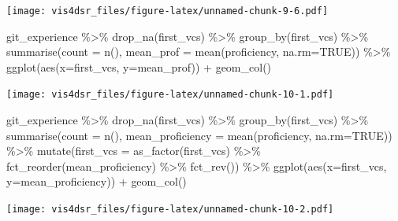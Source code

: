 \documentclass[
]{krantz}
\makeatletter
\newenvironment{Shaded}{\begin{snugshade}}{\end{snugshade}}
\newcommand{\AttributeTok}[1]{\textcolor[rgb]{0.61,0.61,0.61}{#1}}
\newcommand{\ConstantTok}[1]{\textcolor[rgb]{0,0,0}{#1}}
\newcommand{\FunctionTok}[1]{\textcolor[rgb]{0,0,0}{#1}}
\newcommand{\NormalTok}[1]{#1}
\newcommand{\SpecialCharTok}[1]{\textcolor[rgb]{0,0,0}{#1}}
\newenvironment{kframe}{%
\medskip{}
\setlength{\fboxsep}{.8em}
 \def\at@end@of@kframe{}%
 \ifinner\ifhmode%
  \def\at@end@of@kframe{\end{minipage}}%
  \begin{minipage}{\columnwidth}%
 \fi\fi%
 \def\FrameCommand##1{\hskip\@totalleftmargin \hskip-\fboxsep
 \colorbox{shadecolor}{##1}\hskip-\fboxsep
     \hskip-\linewidth \hskip-\@totalleftmargin \hskip\columnwidth}%
 \MakeFramed {\advance\hsize-\width
   \@totalleftmargin\z@ \linewidth\hsize
   \@setminipage}}%
 {\par\unskip\endMakeFramed%
 \at@end@of@kframe}
\renewenvironment{Shaded}{\begin{kframe}}{\end{kframe}}
\makeatother
\begin{document}
\texttt{[image: vis4dsr\_files/figure-latex/unnamed-chunk-9-6.pdf]}

\begin{Shaded}
\begin{Highlighting}[]
\NormalTok{git\_experience }\SpecialCharTok{\%\textgreater{}\%} \FunctionTok{drop\_na}\NormalTok{(first\_vcs) }\SpecialCharTok{\%\textgreater{}\%}
  \FunctionTok{group\_by}\NormalTok{(first\_vcs) }\SpecialCharTok{\%\textgreater{}\%} 
  \FunctionTok{summarise}\NormalTok{(}\AttributeTok{count =} \FunctionTok{n}\NormalTok{(), }\AttributeTok{mean\_prof =} \FunctionTok{mean}\NormalTok{(proficiency, }\AttributeTok{na.rm=}\ConstantTok{TRUE}\NormalTok{)) }\SpecialCharTok{\%\textgreater{}\%}
  \FunctionTok{ggplot}\NormalTok{(}\FunctionTok{aes}\NormalTok{(}\AttributeTok{x=}\NormalTok{first\_vcs, }\AttributeTok{y=}\NormalTok{mean\_prof)) }\SpecialCharTok{+}
    \FunctionTok{geom\_col}\NormalTok{()}
\end{Highlighting}
\end{Shaded}

\texttt{[image: vis4dsr\_files/figure-latex/unnamed-chunk-10-1.pdf]}

\begin{Shaded}
\begin{Highlighting}[]
\NormalTok{git\_experience }\SpecialCharTok{\%\textgreater{}\%} 
  \FunctionTok{drop\_na}\NormalTok{(first\_vcs) }\SpecialCharTok{\%\textgreater{}\%}
  \FunctionTok{group\_by}\NormalTok{(first\_vcs) }\SpecialCharTok{\%\textgreater{}\%} 
  \FunctionTok{summarise}\NormalTok{(}\AttributeTok{count =} \FunctionTok{n}\NormalTok{(), }\AttributeTok{mean\_proficiency =} \FunctionTok{mean}\NormalTok{(proficiency, }\AttributeTok{na.rm=}\ConstantTok{TRUE}\NormalTok{)) }\SpecialCharTok{\%\textgreater{}\%}
  \FunctionTok{mutate}\NormalTok{(}\AttributeTok{first\_vcs =} \FunctionTok{as\_factor}\NormalTok{(first\_vcs) }\SpecialCharTok{\%\textgreater{}\%} 
           \FunctionTok{fct\_reorder}\NormalTok{(mean\_proficiency) }\SpecialCharTok{\%\textgreater{}\%} \FunctionTok{fct\_rev}\NormalTok{()) }\SpecialCharTok{\%\textgreater{}\%}
  \FunctionTok{ggplot}\NormalTok{(}\FunctionTok{aes}\NormalTok{(}\AttributeTok{x=}\NormalTok{first\_vcs, }\AttributeTok{y=}\NormalTok{mean\_proficiency)) }\SpecialCharTok{+}
    \FunctionTok{geom\_col}\NormalTok{()}
\end{Highlighting}
\end{Shaded}

\texttt{[image: vis4dsr\_files/figure-latex/unnamed-chunk-10-2.pdf]}
\end{document}
